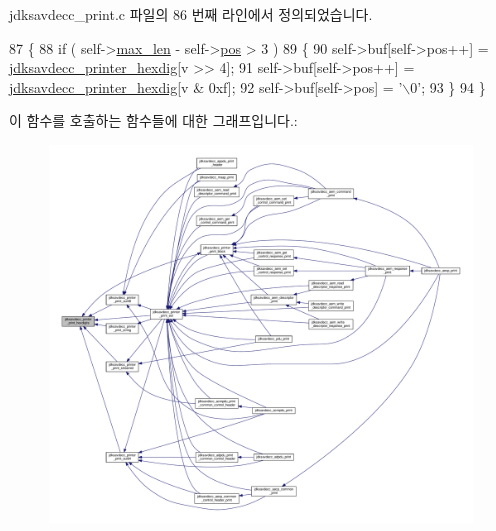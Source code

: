 jdksavdecc\+\_\+print.\+c 파일의 86 번째 라인에서 정의되었습니다.


\begin{DoxyCode}
87 \{
88     \textcolor{keywordflow}{if} ( self->\hyperlink{structjdksavdecc__printer_a956cb5a3c4322e6d67c2f2b21077716c}{max\_len} - self->\hyperlink{structjdksavdecc__printer_a5438a597ee291f523ae04a9fe355924f}{pos} > 3 )
89     \{
90         \textcolor{keyword}{self}->buf[\textcolor{keyword}{self}->pos++] = \hyperlink{jdksavdecc__print_8c_ad23c15dfac839a83ff16748e1737ba80}{jdksavdecc\_printer\_hexdig}[v >> 4];
91         \textcolor{keyword}{self}->buf[\textcolor{keyword}{self}->pos++] = \hyperlink{jdksavdecc__print_8c_ad23c15dfac839a83ff16748e1737ba80}{jdksavdecc\_printer\_hexdig}[v & 0xf];
92         \textcolor{keyword}{self}->buf[\textcolor{keyword}{self}->pos] = \textcolor{charliteral}{'\(\backslash\)0'};
93     \}
94 \}
\end{DoxyCode}


이 함수를 호출하는 함수들에 대한 그래프입니다.\+:
\nopagebreak
\begin{figure}[H]
\begin{center}
\leavevmode
\includegraphics[width=350pt]{group__util_ga6ee1e417ed3ee0efc12d4ed87e38c405_icgraph}
\end{center}
\end{figure}


